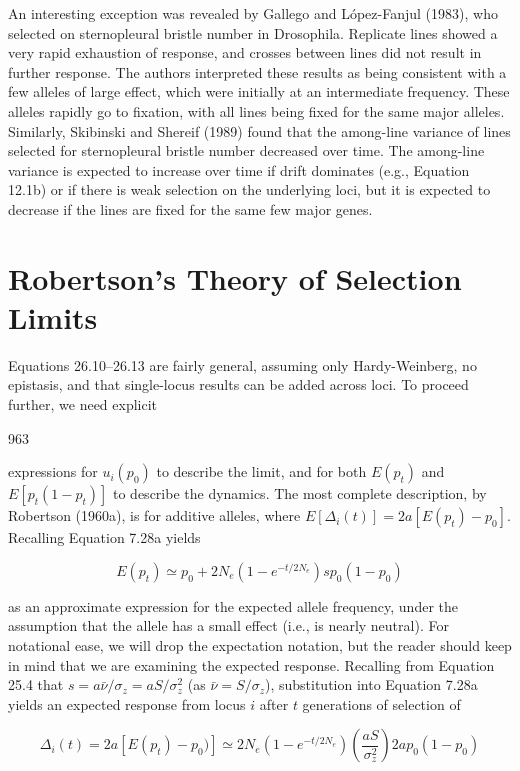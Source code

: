 \documentclass{article}
\begin{document}
An interesting exception was revealed by Gallego and López-Fanjul (1983), who selected on sternopleural bristle number in Drosophila. Replicate lines showed a very rapid exhaustion of response, and crosses between lines did not result in further response. The authors interpreted these results as being consistent with a few alleles of large effect, which were initially at an intermediate frequency. These alleles rapidly go to fixation, with all lines being fixed for the same major alleles. Similarly, Skibinski and Shereif (1989) found that the among-line variance of lines selected for sternopleural bristle number decreased over time. The among-line variance is expected to increase over time if drift dominates (e.g., Equation 12.1b) or if there is weak selection on the underlying loci, but it is expected to decrease if the lines are fixed for the same few major genes.

\section{Robertson's Theory of Selection Limits}
Equations 26.10–26.13 are fairly general, assuming only Hardy-Weinberg, no epistasis, and that single-locus results can be added across loci. To proceed further, we need explicit

963

expressions for  $ u_i(p_0) $ to describe the limit, and for both  $ E(p_t) $ and  $ E[p_t(1-p_t)] $ to describe the dynamics. The most complete description, by Robertson (1960a), is for additive alleles, where  $ E[\Delta_i(t)] = 2a[E(p_t) - p_0] $. Recalling Equation 7.28a yields

\begin{equation}
E(p_{t})\simeq p_{0}+2N_{e}\left(1-e^{-t/2N_{e}}\right)s p_{0}(1-p_{0})
\end{equation}

as an approximate expression for the expected allele frequency, under the assumption that the allele has a small effect (i.e., is nearly neutral). For notational ease, we will drop the expectation notation, but the reader should keep in mind that we are examining the expected response. Recalling from Equation 25.4 that $s = a\bar{\nu}/\sigma_z = aS/\sigma_z^2$ (as $\bar{\nu} = S/\sigma_z$), substitution into Equation 7.28a yields an expected response from locus $i$ after $t$ generations of selection of

\begin{equation}
\Delta_{i}(t)=2a[E(p_{t})-p_{0})]\simeq2N_{e}\left(1-e^{-t/2N_{e}}\right)\left(\frac{a S}{\sigma_{z}^{2}}\right)2a p_{0}(1-p_{0})
\tag{26.14a}
\label{eq:26_14a}
\end{equation}
\end{document}
